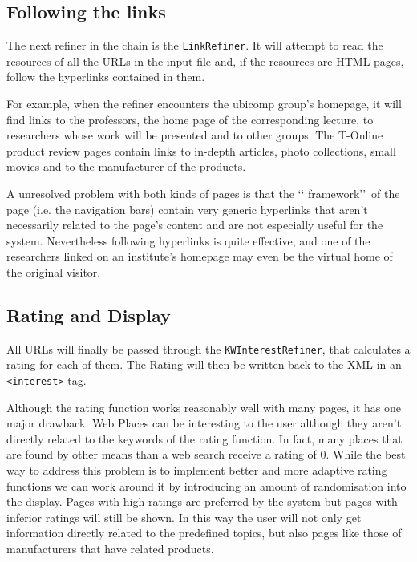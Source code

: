 \documentclass[a4paper]{danarticle}
\theoremstyle{remark}
\begin{document}
    \subsection{Following the links}
      The next refiner in the chain is the \verb$LinkRefiner$. It will attempt
      to read the resources of all the URLs in the input file and, if the
      resources are HTML pages, follow the hyperlinks contained in them.
      
      For example, when the refiner encounters the ubicomp group's homepage, it
      will find links to the professors, the home page of the corresponding
      lecture, to researchers whose work will be presented and to other groups.
      The T-Online product review pages contain links to in-depth articles,
      photo collections, small movies and to the manufacturer of the products.
      
      A unresolved problem with both kinds of pages is that the \lq\lq
      framework\rq\rq\ of the page (i.e. the navigation bars) contain very
      generic hyperlinks that aren't necessarily related to the page's content
      and are not especially useful for the system.
      Nevertheless following hyperlinks is quite effective, and one of the
      researchers linked on an institute's homepage may even be the virtual home
      of the original visitor.
    \subsection{Rating and Display}
      All URLs will finally be passed through the \verb$KWInterestRefiner$, that
      calculates a rating for each of them. The Rating will then be written back
      to the XML in an \verb$<interest>$ tag. 
      
      Although the rating function works reasonably well with many pages, it has
      one major drawback: Web Places can be interesting to the user although
      they aren't directly related to the keywords of the rating function. In
      fact, many places that are found by other means than a web search receive
      a rating of 0. While the best way to address this problem is to implement
      better and more adaptive rating functions we can work around it by
      introducing an amount of randomisation into the display. Pages with high
      ratings are preferred by the system but pages with inferior ratings will
      still be shown. In this way the user will not only get information
      directly related to the predefined topics, but also pages like those of
      manufacturers that have related products.
\end{document}
